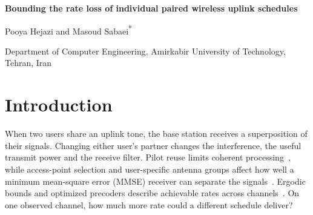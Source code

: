 \documentclass[11pt,letterpaper]{article}
\begin{document}
\begin{center}
{\LARGE\bfseries Bounding the rate loss of individual paired wireless uplink schedules\par}
\vspace{0.65em}
{\large Pooya Hejazi and Masoud Sabaei\textsuperscript{*}\par}
\vspace{0.3em}
Department of Computer Engineering, Amirkabir University of Technology, Tehran, Iran\\

\end{center}

\begin{abstract}
How much could a base station gain by changing the users and powers it assigns to its uplink tones? We bound that gain for an individual schedule in which two users share each tone and the receiver applies a separate linear filter to each. We bound pair rates over continuous powers and combine them using a verifiable matching certificate. A four-user example shows that even optimal tone prices can leave a gap. Across 512 simulated topologies per size, deterministic search gave median loss bounds of 0.061 and 0.067 bit/s/Hz at 32 and 64 users, with median computation times of 18 and 80 ms. In a retrospective comparison, the tightest of seven ceilings certified 395 and 426 unchanged zero-price schedules within 0.15 bit/s/Hz of optimality. On two array recordings, projected floors reached 24--28\% of later-pilot rates in median paired comparisons. A separate receiver decoded the simultaneous six-user transmissions with uncoded bit error rates of 0.0593\% and 37.13\% in the shared-clock and local-clock recordings. These recordings contained one acquisition per mode and no packet outcomes for the proposed pairs.
\end{abstract}

\section*{Introduction}
When two users share an uplink tone, the base station receives a superposition of their signals. Changing either user's partner changes the interference, the useful transmit power and the receive filter. Pilot reuse limits coherent processing~\cite{marzetta}, while access-point selection and user-specific antenna groups affect how well a minimum mean-square error (MMSE) receiver can separate the signals~\cite{ngo,bjornson,demir,buzzi}. Ergodic bounds and optimized precoders describe achievable rates across channels~\cite{caire,wang}. On one observed channel, how much more rate could a different schedule deliver?
\end{document}
